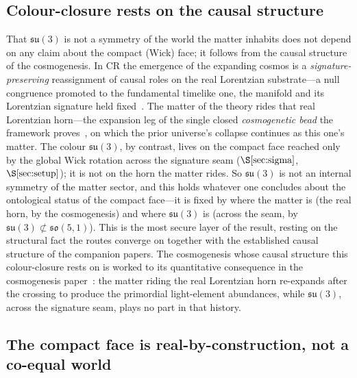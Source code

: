 \documentclass[11pt]{article}
\theoremstyle{plain}
\theoremstyle{remark}
\newcommand{\so}{\mathfrak{so}}
\newcommand{\su}{\mathfrak{su}}
\begin{document}
\subsection{Colour-closure rests on the causal structure}\label{sec:decoupling}

That $\su(3)$ is not a symmetry of the world the matter inhabits does not depend on any claim about the compact (Wick) face; it follows from the causal structure of the cosmogenesis. In CR the emergence of the expanding cosmos is a \emph{signature-preserving} reassignment of causal roles on the real Lorentzian substrate---a null congruence promoted to the fundamental timelike one, the manifold and its Lorentzian signature held fixed~\cite{JanzenCRframework, JanzenBHcausality}. The matter of the theory rides that real Lorentzian horn---the expansion leg of the single closed \emph{cosmogenetic bead} the framework proves~\cite{JanzenCRframework}, on which the prior universe's collapse continues as this one's matter. The colour $\su(3)$, by contrast, lives on the compact face reached only by the global Wick rotation across the signature seam ($\S\ref{sec:sigma}$, $\S\ref{sec:setup}$); it is not on the horn the matter rides. So $\su(3)$ is not an internal symmetry of the matter sector, and this holds whatever one concludes about the ontological status of the compact face---it is fixed by where the matter is (the real horn, by the cosmogenesis) and where $\su(3)$ is (across the seam, by $\su(3)\not\subset\so(5,1)$). This is the most secure layer of the result, resting on the structural fact the routes converge on together with the established causal structure of the companion papers. The cosmogenesis whose causal structure this colour-closure rests on is worked to its quantitative consequence in the cosmogenesis paper~\cite{JanzenCosmogenesis}: the matter riding the real Lorentzian horn re-expands after the crossing to produce the primordial light-element abundances, while $\su(3)$, across the signature seam, plays no part in that history.

\subsection{The compact face is real-by-construction, not a co-equal world}\label{sec:face-status}
\end{document}

